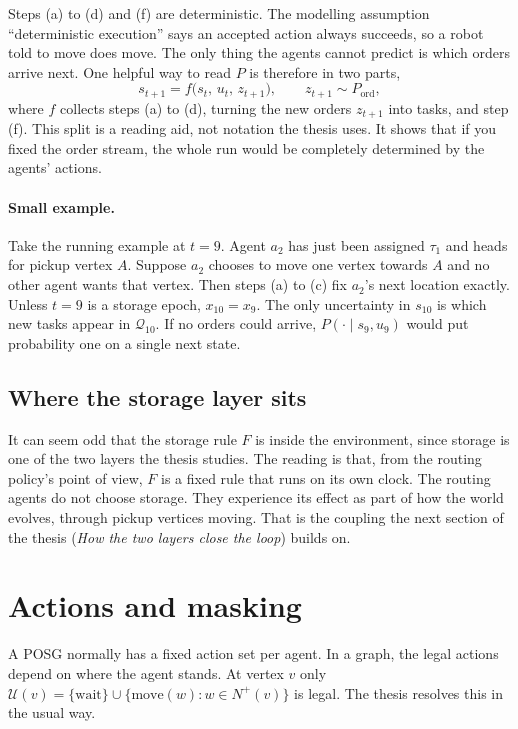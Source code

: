 \documentclass[11pt,a4paper]{article}
\begin{document}
Steps (a) to (d) and (f) are deterministic. The modelling assumption
``deterministic execution'' says an accepted action always succeeds, so a
robot told to move does move. The only thing the agents cannot predict
is which orders arrive next. One helpful way to read $P$ is therefore in
two parts,
\[
  s_{t+1} = f\bigl(s_t,\, u_t,\, z_{t+1}\bigr), \qquad
  z_{t+1} \sim P_{\mathrm{ord}},
\]
where $f$ collects steps (a) to (d), turning the new orders $z_{t+1}$
into tasks, and step (f). This split is a reading aid, not notation the
thesis uses. It shows that if you fixed the order stream, the whole run
would be completely determined by the agents' actions.

\paragraph{Small example.} Take the running example at $t=9$. Agent
$a_2$ has just been assigned $\tau_1$ and heads for pickup vertex $A$.
Suppose $a_2$ chooses to move one vertex towards $A$ and no other agent
wants that vertex. Then steps (a) to (c) fix $a_2$'s next location
exactly. Unless $t=9$ is a storage epoch, $x_{10}=x_9$. The only
uncertainty in $s_{10}$ is which new tasks appear in $\mathcal{Q}_{10}$.
If no orders could arrive, $P(\cdot \mid s_9, u_9)$ would put
probability one on a single next state.

\subsection{Where the storage layer sits}

It can seem odd that the storage rule $F$ is inside the environment,
since storage is one of the two layers the thesis studies. The reading
is that, from the routing policy's point of view, $F$ is a fixed rule
that runs on its own clock. The routing agents do not choose storage.
They experience its effect as part of how the world evolves, through
pickup vertices moving. That is the coupling the next section of the
thesis (\emph{How the two layers close the loop}) builds on.

\section{Actions and masking}
\label{sec:guide-actions}

A POSG normally has a fixed action set per agent. In a graph, the legal
actions depend on where the agent stands. At vertex $v$ only
$\mathcal{U}(v) = \{\mathrm{wait}\} \cup \{\mathrm{move}(w) : w \in N^+(v)\}$
is legal. The thesis resolves this in the usual way.
\end{document}
